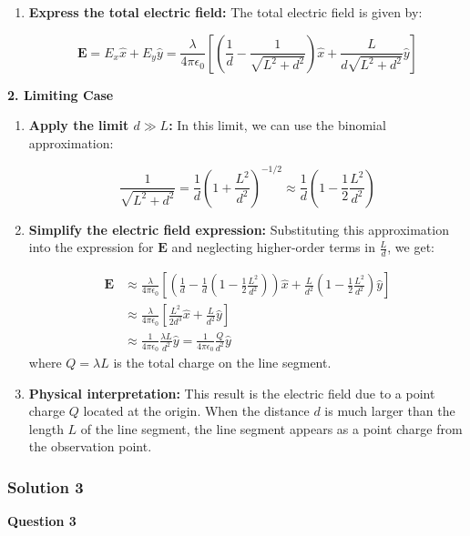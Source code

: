 \documentclass{article}
\begin{document}
\begin{enumerate}
\item \textbf{Express the total electric field:} The total electric field is given by:

    \[\mathbf{E} = E_x \hat{x} + E_y \hat{y} = \frac{\lambda}{4\pi\epsilon_0} \left[\left(\frac{1}{d} - \frac{1}{\sqrt{L^2 + d^2}}\right) \hat{x} + \frac{L}{d \sqrt{L^2 + d^2}} \hat{y}\right]\]
\end{enumerate}

\textbf{2. Limiting Case}

\begin{enumerate}
\item \textbf{Apply the limit \(d \gg L\):} In this limit, we can use the binomial approximation:

    \[\frac{1}{\sqrt{L^2 + d^2}} = \frac{1}{d} \left(1 + \frac{L^2}{d^2}\right)^{-1/2} \approx \frac{1}{d} \left(1 - \frac{1}{2} \frac{L^2}{d^2}\right)\]

\item \textbf{Simplify the electric field expression:} Substituting this approximation into the expression for \(\mathbf{E}\) and neglecting higher-order terms in \(\frac{L}{d}\), we get:

    \begin{align*}
    \mathbf{E} &\approx \frac{\lambda}{4\pi\epsilon_0} \left[\left(\frac{1}{d} - \frac{1}{d} \left(1 - \frac{1}{2} \frac{L^2}{d^2}\right)\right) \hat{x} + \frac{L}{d^2} \left(1 - \frac{1}{2} \frac{L^2}{d^2}\right) \hat{y}\right] \\
    &\approx \frac{\lambda}{4\pi\epsilon_0} \left[\frac{L^2}{2d^3} \hat{x} + \frac{L}{d^2} \hat{y}\right] \\
    &\approx \frac{1}{4\pi\epsilon_0} \frac{\lambda L}{d^2} \hat{y} = \frac{1}{4\pi\epsilon_0} \frac{Q}{d^2} \hat{y}
    \end{align*}
    where \(Q = \lambda L\) is the total charge on the line segment.

\item \textbf{Physical interpretation:} This result is the electric field due to a point charge \(Q\) located at the origin. When the distance \(d\) is much larger than the length \(L\) of the line segment, the line segment appears as a point charge from the observation point.
\end{enumerate}

\subsubsection{Solution 3}
\textbf{Question 3}
\end{document}
